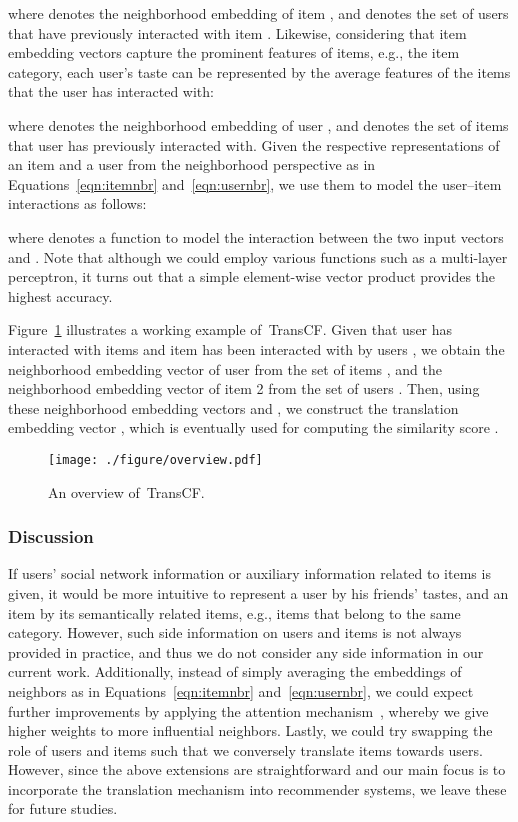 \documentclass[conference]{IEEEtran}
\newcommand{\propose}{\textsf{{TransCF}}}
\begin{document}
where  denotes the neighborhood embedding of item , and  denotes the set of users that have previously interacted with item . 
Likewise, considering that item embedding vectors capture the prominent features of items, e.g., the item category, each user's taste can be represented by the average features of the items that the user has interacted with: 

where  denotes the neighborhood embedding of user , and  denotes the set of items that user  has previously interacted with.
Given the respective representations of an item and a user from the neighborhood perspective as in Equations~\ref{eqn:itemnbr} and~\ref{eqn:usernbr}, we use them to model the user--item interactions as follows:

where  denotes a function to model the interaction between the two input vectors  and . Note that although we could employ various functions such as a multi-layer perceptron,
it turns out that a simple element-wise vector product provides the highest accuracy.


Figure~\ref{fig:overview} illustrates a working example of~\propose.
Given that user  has interacted with items  and item  has been interacted with by users , 
we obtain the neighborhood embedding vector  of user  from the set of items , and the neighborhood embedding vector  of item 2 from the set of users . Then, using these neighborhood embedding vectors  and , we construct the translation embedding vector , which is eventually used for computing the similarity score .




\begin{figure}
	\centering
	\texttt{[image: ./figure/overview.pdf]}
\caption{An overview of~\propose. }
	\label{fig:overview}
	\vspace{-3ex}
\end{figure}
\smallskip


\subsubsection{\textbf{Discussion}}
\label{sec:discussion}
If users' social network information or auxiliary information related to items is given, it would be more intuitive to represent a user by his friends' tastes, and an item by its semantically related items, e.g., items that belong to the same category. However, such side information on users and items is not always provided in practice, and thus we do not consider any side information in our current work. 
Additionally, instead of simply averaging the embeddings of neighbors as in Equations~\ref{eqn:itemnbr} and~\ref{eqn:usernbr}, we could expect further improvements by applying the attention mechanism~\cite{bahdanau2014neural}, whereby we 
give higher weights to more influential neighbors.
Lastly, we could try swapping the role of users and items such that we conversely translate items towards users.
However, since the above extensions are straightforward and our main focus is to incorporate the translation mechanism into recommender systems, we leave these for future studies.
\end{document}
